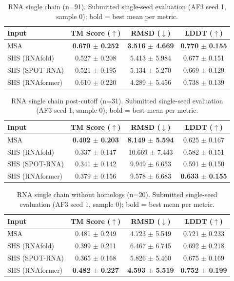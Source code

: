 \begin{table}[htbp]
\centering
\caption{RNA single chain (n=91). Submitted single-seed evaluation (AF3 seed 1, sample 0); bold = best mean per metric.}
\label{tab:rna_single_chain}
\begin{tabular}{lccc}
\toprule
Input & TM Score ($\uparrow$) & RMSD ($\downarrow$) & LDDT ($\uparrow$) \\
\midrule
MSA & \textbf{0.670 $\pm$ 0.252} & \textbf{3.516 $\pm$ 4.669} & \textbf{0.770 $\pm$ 0.155} \\
SHS (RNAfold) & 0.527 $\pm$ 0.208 & 5.413 $\pm$ 5.984 & 0.677 $\pm$ 0.151 \\
SHS (SPOT-RNA) & 0.521 $\pm$ 0.195 & 5.134 $\pm$ 5.270 & 0.669 $\pm$ 0.129 \\
SHS (RNAformer) & 0.610 $\pm$ 0.220 & 4.289 $\pm$ 5.456 & 0.738 $\pm$ 0.139 \\
\bottomrule
\end{tabular}
\end{table}

\begin{table}[htbp]
\centering
\caption{RNA single chain post-cutoff (n=31). Submitted single-seed evaluation (AF3 seed 1, sample 0); bold = best mean per metric.}
\label{tab:rna_single_chain_post_cutoff}
\begin{tabular}{lccc}
\toprule
Input & TM Score ($\uparrow$) & RMSD ($\downarrow$) & LDDT ($\uparrow$) \\
\midrule
MSA & \textbf{0.402 $\pm$ 0.203} & \textbf{8.149 $\pm$ 5.594} & 0.625 $\pm$ 0.167 \\
SHS (RNAfold) & 0.337 $\pm$ 0.147 & 10.669 $\pm$ 7.443 & 0.582 $\pm$ 0.151 \\
SHS (SPOT-RNA) & 0.341 $\pm$ 0.142 & 9.949 $\pm$ 6.653 & 0.591 $\pm$ 0.150 \\
SHS (RNAformer) & 0.379 $\pm$ 0.156 & 9.578 $\pm$ 6.683 & \textbf{0.633 $\pm$ 0.155} \\
\bottomrule
\end{tabular}
\end{table}

\begin{table}[htbp]
\centering
\caption{RNA single chain without homologs (n=20). Submitted single-seed evaluation (AF3 seed 1, sample 0); bold = best mean per metric.}
\label{tab:rna_single_chain_without_homologs}
\begin{tabular}{lccc}
\toprule
Input & TM Score ($\uparrow$) & RMSD ($\downarrow$) & LDDT ($\uparrow$) \\
\midrule
MSA & 0.481 $\pm$ 0.249 & 4.723 $\pm$ 5.549 & 0.721 $\pm$ 0.233 \\
SHS (RNAfold) & 0.399 $\pm$ 0.211 & 6.467 $\pm$ 6.745 & 0.692 $\pm$ 0.218 \\
SHS (SPOT-RNA) & 0.365 $\pm$ 0.168 & 5.826 $\pm$ 5.460 & 0.675 $\pm$ 0.169 \\
SHS (RNAformer) & \textbf{0.482 $\pm$ 0.227} & \textbf{4.593 $\pm$ 5.519} & \textbf{0.752 $\pm$ 0.199} \\
\bottomrule
\end{tabular}
\end{table}

